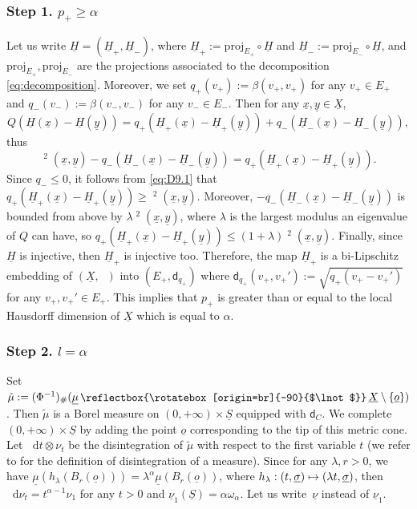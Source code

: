 \documentclass[JEP,XML,SOM,Unicode,published]{cedram}
\newcommand\mto{\mathchoice{\longmapsto}{\mapsto}{\mapsto}{\mapsto}}
\let\backslash\setminus
\theoremstyle{plain}
\theoremstyle{definition}
\newcommand{\di}{\mathop{}\!\mathrm{d}}
\newcommand{\measrestr}{%
\,\raisebox{-.127ex}{\reflectbox{\rotatebox[origin=br]{-90}{$\lnot$}}}\,%
}
\newcommand{\dist}{\mathsf{d}}
\newcommand{\uX}{\underline{X}}
\newcommand{\usigma}{\underline{\sigma}}
\DeclareMathOperator{\udist}{\underline{\dist}}
\newcommand{\uo}{\underline{o}}
\newcommand{\ux}{\underline{x}}
\newcommand{\uH}{\underline{H}}
\newcommand{\uS}{\underline{S}}
\newcommand{\umu}{\underline{\mu}}
\newcommand{\unu}{\underline{\nu}}
\newcommand{\uy}{\underline{y}}
\begin{document}
\subsubsection*{Step 1. $p_+ \ge \alpha$}

Let us write $\uH=(\uH_+,\uH_-)$, where $\uH_+:=\mathrm{proj}_{E_+} \circ \uH$ and $\uH_-:=\mathrm{proj}_{E_-} \circ \uH$, and $\mathrm{proj}_{E_+}, \mathrm{proj}_{E_-}$ are the projections associated to the decomposition \eqref{eq:decomposition}. Moreover, we set $q_+(v_+):=\beta(v_+,v_+)$ for any $v_+ \in E_+$ and $q_-(v_-):=\beta(v_-,v_-)$ for any $v_- \in E_-$. Then for any $\ux, \uy \in \uX$,
\[
Q(\uH(\ux)-\uH(\uy)) = q_+(\uH_+(\ux)-\uH_+(\uy)) + q_-(\uH_-(\ux)-\uH_-(\uy)),
\]
thus
\begin{equation}\label{eq:D9.1}
\udist^2(\ux,\uy) - q_-(\uH_-(\ux)-\uH_-(\uy)) = q_+(\uH_+(\ux)-\uH_+(\uy)).
\end{equation}
Since $q_- \le 0$, it follows from \eqref{eq:D9.1} that $q_+(\uH_+(\ux)-\uH_+(\uy)) \ge \udist^2(\ux,\uy)$. Moreover, $- q_-(\uH_-(\ux)-\uH_-(\uy))$ is bounded from above by $\lambda \udist^2(\ux,\uy)$, where $\lambda$ is the largest modulus an eigenvalue of $Q$ can have, so $q_+(\uH_+(\ux)-\uH_+(\uy)) \le (1+\lambda)\udist^2(\ux,\uy)$. Finally, since $\uH$ is injective, then $\uH_+$ is injective too. Therefore, the map $\uH_+$ is a bi-Lipschitz embedding of $(\uX,\udist)$ into $(E_+,\dist_{q_+})$ where $\dist_{q_+}(v_+,v_+'):=\sqrt{q_+(v_+-v_+')}$ for any $v_+, v_+' \in E_+$. This implies that $p_+$ is greater than or equal to the local Hausdorff dimension of $\uX$ which is equal to $\alpha$.

\subsubsection*{Step 2. $l=\alpha$}

Set $\tilde{\mu}:= (\Phi^{-1})_{\#}(\umu \measrestr \uX \backslash \{\uo\})$. Then $\tilde{\mu}$ is a Borel measure on $(0,+\infty)\times \uS$ equipped with $\dist_C$. We complete $(0,+\infty)\times \uS$ by adding the point $\uo$ corresponding to the tip of this metric cone. Let $\di t \otimes \nu_t$ be the disintegration of $\tilde{\mu}$ with respect to the first variable $t$ (we refer to \cite[2.5]{AmbrosioFuscoPallara} for the definition of disintegration of a measure). Since for any $\lambda,r>0$, we have $\umu(h_{\lambda}(B_r(\uo)))=\lambda^{\alpha} \umu(B_r(\uo))$, where $h_\lambda: (t,\usigma)\mto (\lambda t, \usigma)$, then $\di \nu_t=t^{\alpha-1}\nu_1$ for any $t>0$ and $\unu_1(\uS)=\alpha \omega_\alpha$. Let us write~$\unu$ instead of $\unu_1$.
\end{document}
